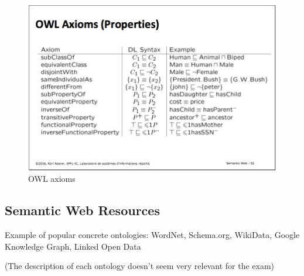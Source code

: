 \begin{figure}[H]
\begin{center}
\includegraphics[width=1\linewidth]{figures/owl_axioms.png}
\end{center}
\caption{OWL axioms}
\end{figure}


\subsection{Semantic Web Resources}
Example of popular concrete ontologies: WordNet, Schema.org, WikiData, Google Knowledge Graph, Linked Open Data

(The description of each ontology doesn't seem very relevant for the exam)
